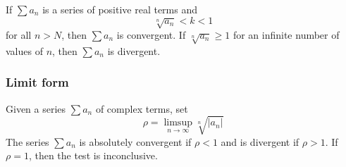 \documentclass[12pt]{article}
\begin{document}
If $\sum a_{n}$ is a series of positive real terms and
$$\sqrt[n]{a_{n}} < k < 1$$
for all $n > N$, then $\sum a_{n}$ is convergent.  If $\sqrt[n]{a_{n}} \geq 1$ for an infinite number of values of $n$, then $\sum a_{n}$ is divergent.

\subsubsection*{Limit form} Given a series $\sum a_{n}$ of complex terms, set
$$\rho = \limsup_{n \to \infty} \sqrt[n]{| a_{n} |}$$
The series $\sum a_{n}$ is absolutely convergent if $\rho < 1$ and is divergent if $\rho > 1$.  If $\rho = 1$, then the test is inconclusive.
\end{document}
